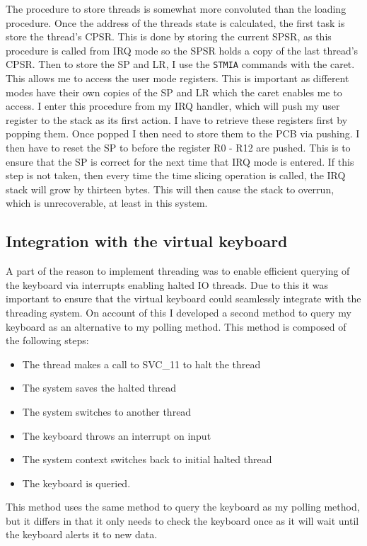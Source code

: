 The procedure to store threads is somewhat more convoluted than the loading procedure. Once the address of the threads state is calculated, the first task is store the thread's CPSR. This is done by storing the current SPSR, as this procedure is called from IRQ mode so the SPSR holds a copy of the last thread's CPSR. Then to store the SP and LR, I use the \verb|STMIA| commands with the caret. This allows me to access the user mode registers. This is important as different modes have their own copies of the SP and LR which the caret enables me to access. I enter this procedure from my IRQ handler, which will push my user register to the stack as its first action. I have to retrieve these registers first by popping them. Once popped I then need to store them to the PCB via pushing. I then have to reset the SP to before the register R0 - R12 are pushed. This is  to ensure that the SP is correct for the next time that IRQ mode is entered. If this step is not taken, then every time the time slicing operation is called, the IRQ stack will grow by thirteen bytes. This will then cause the stack to overrun, which is unrecoverable, at least in this system.


\subsection{Integration with the virtual keyboard}
A part of the reason to implement threading was to enable efficient querying of the keyboard via interrupts enabling halted IO threads. Due to this it was important to ensure that the virtual keyboard could seamlessly integrate with the threading system. On account of this I developed a second method to query my keyboard as an alternative to my polling method. This method is composed of the following steps:

\begin{itemize}
	\item The thread makes a call to SVC\_11 to halt the thread
	\item The system saves the halted thread
	\item The system switches to another thread
	\item The keyboard throws an interrupt on input
	\item The system context switches back to initial halted thread
	\item The keyboard is queried.
\end{itemize}
This method uses the same method to query the keyboard as my polling method, but it differs in that it only needs to check the keyboard once as it will wait until the keyboard alerts it to new data. 

